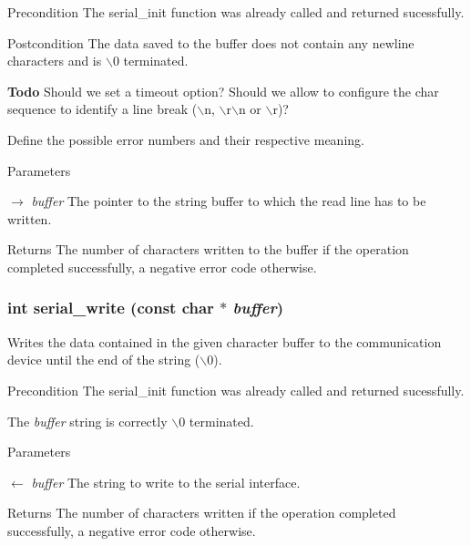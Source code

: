 \begin{DoxyPrecond}{Precondition}
The {\ttfamily serial\_\-init} function was already called and returned sucessfully. 
\end{DoxyPrecond}
\begin{DoxyPostcond}{Postcondition}
The data saved to the buffer does not contain any newline characters and is $\backslash$0 terminated.
\end{DoxyPostcond}
\begin{Desc}
\item[{\bf Todo}]Should we set a timeout option? Should we allow to configure the char sequence to identify a line break ($\backslash$n, $\backslash$r$\backslash$n or $\backslash$r)? 

Define the possible error numbers and their respective meaning.\end{Desc}

\begin{DoxyParams}{Parameters}
\item[\mbox{$\rightarrow$} {\em buffer}]The pointer to the string buffer to which the read line has to be written.\end{DoxyParams}
\begin{DoxyReturn}{Returns}
The number of characters written to the buffer if the operation completed successfully, a negative error code otherwise. 
\end{DoxyReturn}
\subsubsection[{serial\_\-write}]{\setlength{\rightskip}{0pt plus 5cm}int serial\_\-write (const char $\ast$ {\em buffer})}\label{db/d11/serial_8h_a775882b47c1ac472577ef12d5c7d0775}
Writes the data contained in the given character buffer to the communication device until the end of the string ($\backslash$0).

\begin{DoxyPrecond}{Precondition}
The {\ttfamily serial\_\-init} function was already called and returned sucessfully. 

The {\itshape buffer\/} string is correctly $\backslash$0 terminated.
\end{DoxyPrecond}

\begin{DoxyParams}{Parameters}
\item[\mbox{$\leftarrow$} {\em buffer}]The string to write to the serial interface.\end{DoxyParams}
\begin{DoxyReturn}{Returns}
The number of characters written if the operation completed successfully, a negative error code otherwise. 
\end{DoxyReturn}
